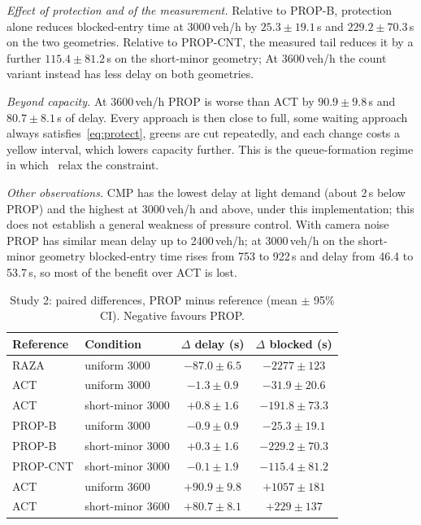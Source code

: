 \documentclass[journal]{IEEEtran}
\begin{document}
\emph{Effect of protection and of the measurement.} Relative to PROP-B, protection alone
reduces blocked-entry time at 3000\,veh/h by $25.3\pm19.1$\,s and $229.2\pm70.3$\,s on the
two geometries. Relative to PROP-CNT, the measured tail reduces it by a further
$115.4\pm81.2$\,s on the short-minor geometry; At 3600\,veh/h the count variant instead has less delay on both geometries.

\emph{Beyond capacity.} At 3600\,veh/h PROP is worse than ACT by $90.9\pm9.8$\,s and
$80.7\pm8.1$\,s of delay. Every approach is then close to full, some waiting approach
always satisfies~\eqref{eq:protect}, greens are cut repeatedly, and each change costs a
yellow interval, which lowers capacity further. This is the queue-formation regime in
which~\cite{mohajerpoor2023} relax the constraint.

\emph{Other observations.} CMP has the lowest delay at light demand (about 2\,s below
PROP) and the highest at 3000\,veh/h and above, under this implementation; this does not establish a general weakness of pressure control.
With camera noise PROP has similar mean delay up to 2400\,veh/h; at 3000\,veh/h on the short-minor
geometry blocked-entry time rises from 753 to 922\,s and delay from 46.4 to 53.7\,s, so
most of the benefit over ACT is lost.

\begin{table}[t]
\caption{Study 2: paired differences, PROP minus reference (mean $\pm$ 95\% CI). Negative favours PROP.}
\label{tab:paired}
\centering
\setlength{\tabcolsep}{3pt}
\begin{tabular}{llcc}
\toprule
Reference & Condition & $\Delta$ delay (s) & $\Delta$ blocked (s)\\
\midrule
RAZA & uniform 3000 & $-87.0\pm6.5$ & $-2277\pm123$\\
ACT & uniform 3000 & $-1.3\pm0.9$ & $-31.9\pm20.6$\\
ACT & short-minor 3000 & $+0.8\pm1.6$ & $-191.8\pm73.3$\\
PROP-B & uniform 3000 & $-0.9\pm0.9$ & $-25.3\pm19.1$\\
PROP-B & short-minor 3000 & $+0.3\pm1.6$ & $-229.2\pm70.3$\\
PROP-CNT & short-minor 3000 & $-0.1\pm1.9$ & $-115.4\pm81.2$\\
ACT & uniform 3600 & $+90.9\pm9.8$ & $+1057\pm181$\\
ACT & short-minor 3600 & $+80.7\pm8.1$ & $+229\pm137$\\
\bottomrule
\end{tabular}
\end{table}
\end{document}

